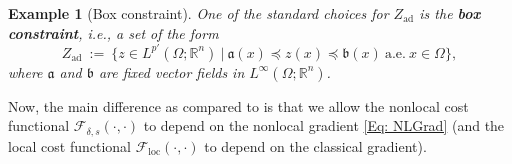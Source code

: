 \documentclass[11pt, reqno]{amsart}   	%
\theoremstyle{plain}
\numberwithin{equation}{section}
\newtheorem{example}[thm]{Example}
\def\de{\delta}
\def\Om{\Omega}
\def\R{\mathbb{R}}
\def\loc{\text{loc}}
\begin{document}
\begin{example}[Box constraint]\label{Rmk: box}
    One of the standard choices for $Z_{\text{ad}}$ is the \textbf{box constraint}, i.e., a set of the form
    \begin{equation}\label{Eq: box}
        Z_{\text{ad}} \ := \ \{z \in L^{p'}(\Om; \R^n)  \ | \ \mathfrak{a}(x) \preceq z(x) \preceq \mathfrak{b}(x) \ \text{a.e.} \ x \in \Om\},
	\end{equation}
    where $\mathfrak{a}$ and $\mathfrak{b}$ are fixed vector fields in $L^{\infty}(\Om; \R^n)$.
\end{example}

Now, the main difference as compared to  \cite{cueto2026localization} is that we allow the nonlocal cost functional $\mathcal{F}_{\de, s}(\cdot, \cdot)$ to depend on the nonlocal gradient \eqref{Eq: NLGrad} (and the local cost functional $\mathcal{F}_{\loc}(\cdot, \cdot)$ to depend on the classical gradient).
\end{document}
